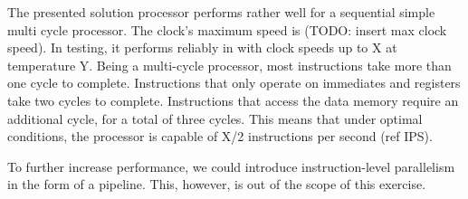 The presented solution processor performs rather well for a sequential simple multi cycle processor.
The clock's maximum speed is (TODO: insert max clock speed).
In testing, it performs reliably in with clock speeds up to X at temperature Y.
Being a multi-cycle processor, most instructions take more than one cycle to complete.
Instructions that only operate on immediates and registers take two cycles to complete.
Instructions that access the data memory require an additional cycle, for a total of three cycles.
This means that under optimal conditions, the processor is capable of X/2 instructions per second (ref IPS).

To further increase performance, we could introduce instruction-level parallelism in the form of a pipeline.
This, however, is out of the scope of this exercise.
